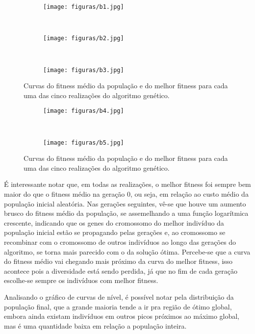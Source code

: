 \documentclass[a4paper, 12pt]{article}
\begin{document}
\begin{figure}[!ht]
\centering
\begin{subfigure}{0.8\textwidth}
    \texttt{[image: figuras/b1.jpg]}
\end{subfigure}
\hfill
\\
\centering
\begin{subfigure}{0.8\textwidth}
    \texttt{[image: figuras/b2.jpg]}
\end{subfigure}
\hfill
\\
\centering
\begin{subfigure}{0.8\textwidth}
    \texttt{[image: figuras/b3.jpg]}
\end{subfigure}
\hfill
\caption{Curvas do fitness médio da população e do melhor fitness para cada uma das cinco realizações do algoritmo genético.}
\label{fig:curvas1}
\end{figure}
\begin{figure}[!ht]
\centering
\begin{subfigure}{0.8\textwidth}
    \texttt{[image: figuras/b4.jpg]}
\end{subfigure}
\hfill
\\
\centering
\begin{subfigure}{0.8\textwidth}
    \texttt{[image: figuras/b5.jpg]}
\end{subfigure}
\hfill
\caption{Curvas do fitness médio da população e do melhor fitness para cada uma das cinco realizações do algoritmo genético.}
\label{fig:curvas2}
\end{figure}

É interessante notar que, em todas as realizações, o melhor fitness foi sempre bem maior do que o fitness médio na geração 0, ou seja, em relação ao custo médio da população inicial aleatória. Nas gerações seguintes, vê-se que houve um aumento brusco do fitness médio da população, se assemelhando a uma função logarítmica crescente, indicando que os genes do cromossomo do melhor indivíduo da população inicial estão se propagando pelas gerações e, ao cromossomo se recombinar com o cromossomo de outros indivíduos ao longo das gerações do algoritmo, se torna mais parecido com o da solução ótima. Percebe-se que a curva do fitness médio vai chegando mais próximo da curva do melhor fitness, isso acontece pois a diversidade está sendo perdida, já que no fim de cada geração escolhe-se sempre os indivíduos com melhor fitness.

Analisando o gráfico de curvas de nível, é possível notar pela distribuição da população final, que a grande maioria tende a ir pra região de ótimo global, embora ainda existam indivíduos em outros picos próximos ao máximo global, mas é uma quantidade baixa em relação a população inteira. 
\end{document}
